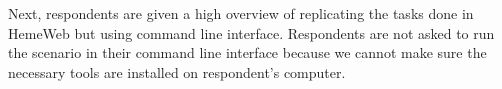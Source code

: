 Next, respondents are given a high overview of replicating the tasks done in HemeWeb but using command line interface. Respondents are not asked to run the scenario in their command line interface because we cannot make sure the necessary tools are installed on respondent's computer.

\vspace{0.5cm}

\noindent%
\begin{minipage}{\linewidth}%
 \label{fig:survey-s1-cli}%
\end{minipage}

\vspace{0.5cm}

\noindent%
\begin{minipage}{\linewidth}%
 \label{fig:survey-s1-cli-barrier}%
\end{minipage}

